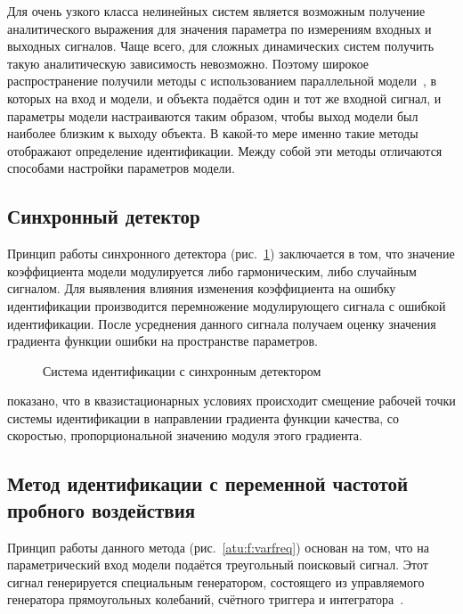 Для очень узкого класса нелинейных систем является возможным
получение аналитического выражения для значения параметра
по измерениям входных и выходных сигналов. Чаще всего,
для сложных динамических систем получить такую аналитическую
зависимость невозможно. Поэтому широкое распространение получили методы
с использованием параллельной модели~\cite{lung_id_sys,gropp_methods_id,deith_method_id_ds},
в которых на вход и модели, и объекта подаётся один и тот же входной сигнал,
и параметры модели настраиваются таким образом, чтобы выход модели
был наиболее близким к выходу объекта. В какой-то мере
именно такие методы отображают определение идентификации.
Между собой эти методы отличаются способами настройки параметров модели.


\subsection{Синхронный детектор} %

Принцип работы синхронного детектора %
(рис.~\ref{atu:f:syncdet})
заключается в том,
что значение коэффициента модели модулируется либо гармоническим,
либо случайным сигналом. Для выявления влияния
изменения коэффициента на ошибку идентификации
производится перемножение модулирующего сигнала с ошибкой
идентификации. После усреднения данного сигнала
получаем оценку значения градиента функции ошибки на
пространстве параметров.

\begin{figure}[htb!]
\begin{center}

\end{center}
\caption{Система идентификации с синхронным детектором}
\label{atu:f:syncdet}
\end{figure}

показано, что в квазистационарных условиях
происходит смещение рабочей точки системы идентификации
в направлении градиента функции качества,
со скоростью, пропорциональной значению модуля этого градиента.


\subsection{Метод идентификации с переменной частотой пробного воздействия} %

Принцип работы данного метода
(рис.~\ref{atu:f:varfreq})
основан на том, что на параметрический вход модели подаётся треугольный поисковый сигнал.
Этот сигнал генерируется специальным генератором,
состоящего из управляемого генератора прямоугольных колебаний,
счётного триггера и интегратора~\cite{adopt_cont_sys,rastr_adop_complex_sys}.


